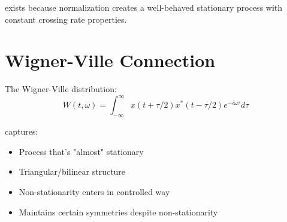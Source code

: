 exists because normalization creates a well-behaved stationary process with constant crossing rate properties.

\section{Wigner-Ville Connection}
The Wigner-Ville distribution:
\[ W(t,\omega) = \int_{-\infty}^{\infty} x(t + \tau/2)x^*(t - \tau/2)e^{-i\omega\tau}d\tau \]

captures:
\begin{itemize}
\item Process that's "almost" stationary
\item Triangular/bilinear structure
\item Non-stationarity enters in controlled way
\item Maintains certain symmetries despite non-stationarity
\end{itemize}

